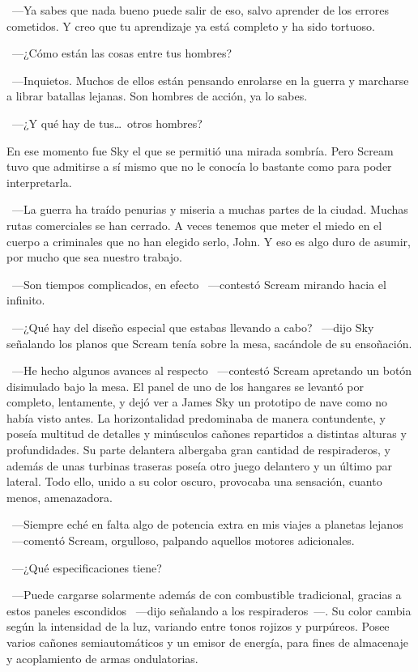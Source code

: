 ~---Ya sabes que nada bueno puede salir de eso, salvo aprender de los errores cometidos. Y creo que tu aprendizaje ya está completo y ha sido tortuoso.

~---¿Cómo están las cosas entre tus hombres?

~---Inquietos. Muchos de ellos están pensando enrolarse en la guerra y marcharse a librar batallas lejanas. Son hombres de acción, ya lo sabes.

~---¿Y qué hay de tus\dots\ otros hombres?

En ese momento fue Sky el que se permitió una mirada sombría. Pero Scream tuvo que admitirse a sí mismo que no le conocía lo bastante como para poder interpretarla.

~---La guerra ha traído penurias y miseria a muchas partes de la ciudad. Muchas rutas comerciales se han cerrado. A veces tenemos que meter el miedo en el cuerpo a criminales que no han elegido serlo, John. Y eso es algo duro de asumir, por mucho que sea nuestro trabajo.

~---Son tiempos complicados, en efecto ~---contestó Scream mirando hacia el infinito.

~---¿Qué hay del diseño especial que estabas llevando a cabo? ~---dijo Sky señalando los planos que Scream tenía sobre la mesa, sacándole de su ensoñación.

~---He hecho algunos avances al respecto ~---contestó Scream apretando un botón disimulado bajo la mesa. El panel de uno de los hangares se levantó por completo, lentamente, y dejó ver a James Sky un prototipo de nave como no había visto antes. La horizontalidad predominaba de manera contundente, y poseía multitud de detalles y minúsculos cañones repartidos a distintas alturas y profundidades. Su parte delantera albergaba gran cantidad de respiraderos, y además de unas turbinas traseras poseía otro juego delantero y un último par lateral. Todo ello, unido a su color oscuro, provocaba una sensación, cuanto menos, amenazadora.

~---Siempre eché en falta algo de potencia extra en mis viajes a planetas lejanos ~---comentó Scream, orgulloso, palpando aquellos motores adicionales.

~---¿Qué especificaciones tiene?

~---Puede cargarse solarmente además de con combustible tradicional, gracias a estos paneles escondidos ~---dijo señalando a los respiraderos~---. Su color cambia según la intensidad de la luz, variando entre tonos rojizos y purpúreos. Posee varios cañones semiautomáticos y un emisor de energía, para fines de almacenaje y acoplamiento de armas ondulatorias.

